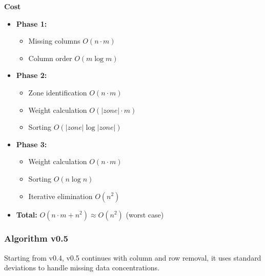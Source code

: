 \documentclass[a4paper,12pt]{article}
\begin{document}
\textbf{Cost}
\begin{itemize}
    \item \textbf{Phase 1:} 
    \begin{itemize}
        \item Missing columns $O(n \cdot m)$ 
        \item Column order $O(m \log m)$
    \end{itemize}
    \item \textbf{Phase 2:}
    \begin{itemize}
        \item Zone identification $O(n \cdot m)$ 
        \item Weight calculation $O(|zone| \cdot m)$
        \item Sorting $O(|zone| \log |zone|)$
    \end{itemize}
    \item \textbf{Phase 3:}
    \begin{itemize}
        \item Weight calculation $O(n \cdot m)$ 
        \item Sorting $O(n \log n)$
        \item Iterative elimination $O(n^2)$
    \end{itemize}
    \item \textbf{Total:} $O(n \cdot m + n^2) \approx O(n^2)$ (worst case)
\end{itemize}


\subsubsection{Algorithm v0.5}
Starting from v0.4, v0.5 continues with column and row removal, it uses standard deviations to handle missing data concentrations.
\end{document}
